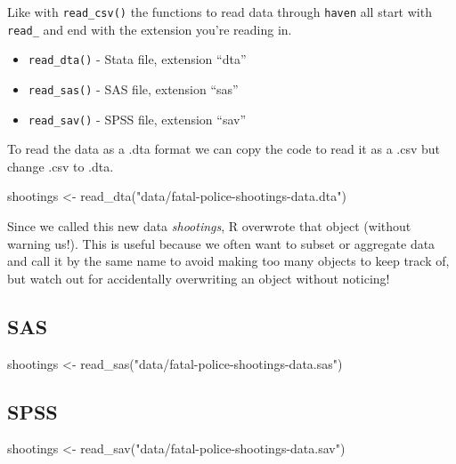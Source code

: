 \documentclass[
]{krantz}
\makeatletter
\newenvironment{Shaded}{\begin{snugshade}}{\end{snugshade}}
\newcommand{\FunctionTok}[1]{\textcolor[rgb]{0,0,0}{#1}}
\newcommand{\NormalTok}[1]{#1}
\newcommand{\OtherTok}[1]{\textcolor[rgb]{0.37,0.37,0.37}{#1}}
\newcommand{\StringTok}[1]{\textcolor[rgb]{0.5,0.5,0.5}{#1}}
\providecommand{\tightlist}{%
  \setlength{\itemsep}{0pt}\setlength{\parskip}{0pt}}
\newenvironment{kframe}{%
\medskip{}
\setlength{\fboxsep}{.8em}
 \def\at@end@of@kframe{}%
 \ifinner\ifhmode%
  \def\at@end@of@kframe{\end{minipage}}%
  \begin{minipage}{\columnwidth}%
 \fi\fi%
 \def\FrameCommand##1{\hskip\@totalleftmargin \hskip-\fboxsep
 \colorbox{shadecolor}{##1}\hskip-\fboxsep
     \hskip-\linewidth \hskip-\@totalleftmargin \hskip\columnwidth}%
 \MakeFramed {\advance\hsize-\width
   \@totalleftmargin\z@ \linewidth\hsize
   \@setminipage}}%
 {\par\unskip\endMakeFramed%
 \at@end@of@kframe}
\renewenvironment{Shaded}{\begin{kframe}}{\end{kframe}}
\makeatother
\begin{document}
Like with \texttt{read\_csv()} the functions to read data through \texttt{haven} all start with \texttt{read\_} and end with the extension you're reading in.

\begin{itemize}
\tightlist
\item
  \texttt{read\_dta()} - Stata file, extension ``dta''
\item
  \texttt{read\_sas()} - SAS file, extension ``sas''
\item
  \texttt{read\_sav()} - SPSS file, extension ``sav''
\end{itemize}

To read the data as a .dta format we can copy the code to read it as a .csv but change .csv to .dta.

\begin{Shaded}
\begin{Highlighting}[]
\NormalTok{shootings }\OtherTok{\textless{}{-}} \FunctionTok{read\_dta}\NormalTok{(}\StringTok{"data/fatal{-}police{-}shootings{-}data.dta"}\NormalTok{)}
\end{Highlighting}
\end{Shaded}

Since we called this new data \emph{shootings}, R overwrote that object (without warning us!). This is useful because we often want to subset or aggregate data and call it by the same name to avoid making too many objects to keep track of, but watch out for accidentally overwriting an object without noticing!

\hypertarget{sas}{%
\subsection{SAS}\label{sas}}

\begin{Shaded}
\begin{Highlighting}[]
\NormalTok{shootings }\OtherTok{\textless{}{-}} \FunctionTok{read\_sas}\NormalTok{(}\StringTok{"data/fatal{-}police{-}shootings{-}data.sas"}\NormalTok{)}
\end{Highlighting}
\end{Shaded}

\hypertarget{spss}{%
\subsection{SPSS}\label{spss}}

\begin{Shaded}
\begin{Highlighting}[]
\NormalTok{shootings }\OtherTok{\textless{}{-}} \FunctionTok{read\_sav}\NormalTok{(}\StringTok{"data/fatal{-}police{-}shootings{-}data.sav"}\NormalTok{)}
\end{Highlighting}
\end{Shaded}
\end{document}
